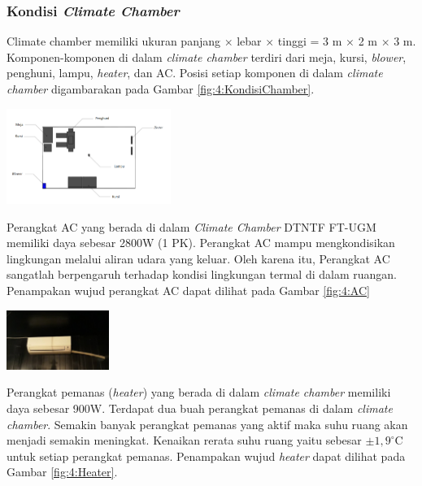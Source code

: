 \documentclass[a4paper,10pt]{article}
\makeatletter
\newenvironment{body}{\begin{multicols}{2}}{\end{multicols}}
\renewenvironment{figure}
{\def\@captype{figure}%
	\captionsetup{labelsep=period,format=hang,font=footnotesize,justification=justified}
}
{}
\makeatother
\begin{document}
\begin{body}
		\subsubsection{Kondisi \textit{Climate Chamber}}
		
		Climate chamber memiliki ukuran panjang $\times$ lebar $\times$ tinggi = 3 m $\times$ 2 m $\times$ 3 m. Komponen-komponen di dalam \textit{climate chamber} terdiri dari meja, kursi, \textit{blower}, penghuni, lampu, \textit{heater}, dan AC. Posisi setiap komponen di dalam \textit{climate chamber} digambarakan pada Gambar \ref{fig:4:KondisiChamber}.
		
		\begin{figure}
			\centering
			\includegraphics[width=0.4\textwidth]{figures/KondisiChamber}
			\caption{Posisi Komponen-Komponen di dalam \textit{Climate Chamber}}
			\label{fig:4:KondisiChamber}
		\end{figure}
		\vspace{2mm}
		
		Perangkat AC yang berada di dalam \textit{Climate Chamber} DTNTF FT-UGM memiliki daya sebesar 2800W (1 PK). Perangkat AC mampu mengkondisikan lingkungan melalui aliran udara yang keluar. Oleh karena itu, Perangkat AC sangatlah berpengaruh terhadap kondisi lingkungan termal di dalam ruangan. Penampakan wujud perangkat AC dapat dilihat pada Gambar \ref{fig:4:AC}\\
		
		\begin{figure}
			\centering
			\includegraphics[width=0.25\textwidth]{figures/AC}
			\caption{Perangkat AC}
			\label{fig:4:AC}
		\end{figure}
		\vspace{1em}
		
		Perangkat pemanas (\textit{heater}) yang berada di dalam \textit{climate chamber} memiliki daya sebesar 900W. Terdapat dua buah perangkat pemanas di dalam \textit{climate chamber}. Semakin banyak perangkat pemanas yang aktif maka suhu ruang akan menjadi semakin meningkat. Kenaikan rerata suhu ruang yaitu sebesar $\pm1,9^\circ$C untuk setiap perangkat pemanas. Penampakan wujud \textit{heater} dapat dilihat pada Gambar \ref{fig:4:Heater}.\\
		

\end{body}
\end{document}
